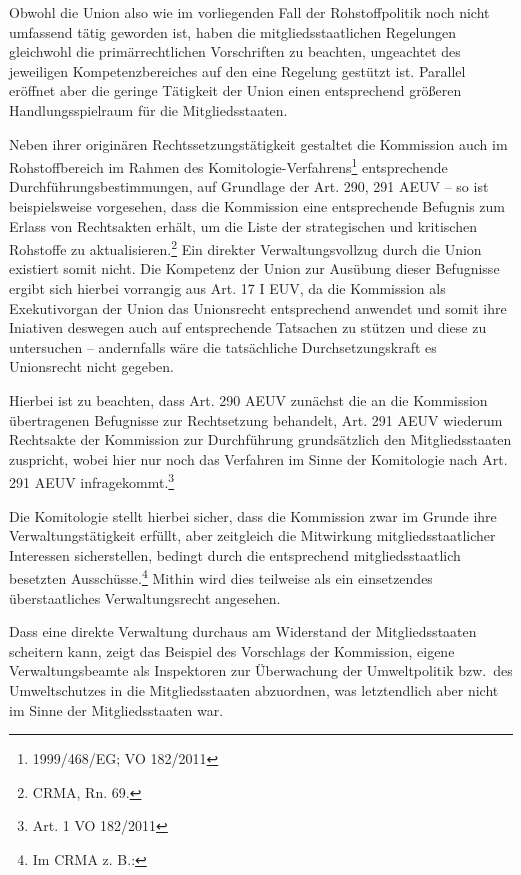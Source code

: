 \documentclass[12pt,a4paper,oneside]{book} %
\begin{document}
	Obwohl die Union also wie im vorliegenden Fall der Rohstoffpolitik noch nicht umfassend tätig geworden ist, haben die mitgliedsstaatlichen Regelungen gleichwohl die primärrechtlichen Vorschriften zu beachten, ungeachtet des jeweiligen Kompetenzbereiches auf den eine Regelung gestützt ist. Parallel eröffnet aber die geringe Tätigkeit der Union einen entsprechend größeren Handlungsspielraum für die Mitgliedsstaaten.
	
	Neben ihrer originären Rechtssetzungstätigkeit gestaltet die Kommission auch im Rohstoffbereich im Rahmen des Komitologie-Verfahrens\footnote{1999/468/EG; VO 182/2011} entsprechende Durchführungsbestimmungen, auf Grundlage der Art. 290, 291 AEUV -- so ist beispielsweise vorgesehen, dass die Kommission eine entsprechende Befugnis zum Erlass von Rechtsakten erhält, um die Liste der strategischen und kritischen Rohstoffe zu aktualisieren.\footnote{CRMA, Rn. 69.} Ein direkter Verwaltungsvollzug durch die Union existiert somit nicht. Die Kompetenz der Union zur Ausübung dieser Befugnisse ergibt sich hierbei vorrangig aus Art. 17 I EUV, da die Kommission als Exekutivorgan der Union\autocite{CITATIONNEEDED} das Unionsrecht entsprechend anwendet und somit ihre Iniativen deswegen auch auf entsprechende Tatsachen zu stützen und diese zu untersuchen -- andernfalls wäre die tatsächliche Durchsetzungskraft es Unionsrecht nicht gegeben.\autocite[siehe hierzu]{frau_2025_S. 407}
	
	Hierbei ist zu beachten, dass Art. 290 AEUV zunächst die an die Kommission übertragenen Befugnisse zur Rechtsetzung behandelt, Art. 291 AEUV wiederum Rechtsakte der Kommission zur Durchführung grundsätzlich den Mitgliedsstaaten zuspricht, wobei hier nur noch das Verfahren im Sinne der Komitologie nach Art. 291 AEUV infragekommt.\footnote{Art. 1 VO 182/2011}
	
	Die Komitologie stellt hierbei sicher, dass die Kommission zwar im Grunde ihre Verwaltungstätigkeit erfüllt, aber zeitgleich die Mitwirkung mitgliedsstaatlicher Interessen sicherstellen, bedingt durch die entsprechend mitgliedsstaatlich besetzten Ausschüsse.\footnote{Im CRMA z. B.: }%
	Mithin wird dies teilweise als ein einsetzendes überstaatliches Verwaltungsrecht angesehen.\autocite{von Sydow, Verwaltungskooperation S. 80 ff.}
	
	Dass eine direkte Verwaltung durchaus am Widerstand der Mitgliedsstaaten scheitern kann, zeigt das Beispiel des Vorschlags der Kommission, eigene Verwaltungsbeamte als Inspektoren zur Überwachung der Umweltpolitik bzw.\, des Umweltschutzes in die Mitgliedsstaaten abzuordnen, was letztendlich aber nicht im Sinne der Mitgliedsstaaten war.\autocite{Dauses/Ludwigs, O. Umweltpolitik, Rn. 226}
	
\end{document}
